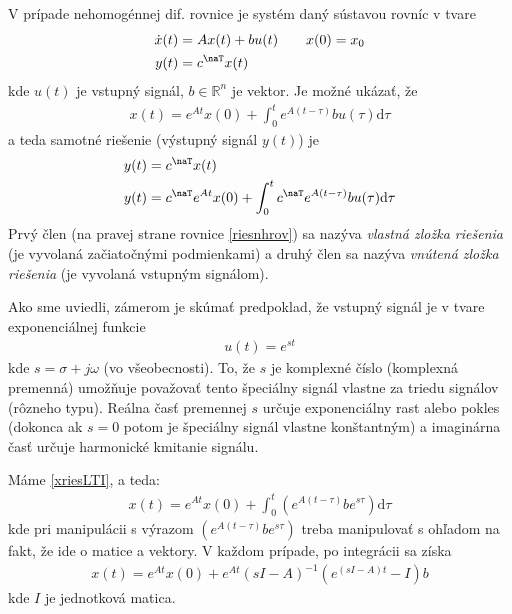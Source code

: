 \documentclass[a4paper, 10pt, ]{article}
\begin{document}
V prípade nehomogénnej dif. rovnice je systém daný sústavou rovníc v tvare
\begin{subequations} \label{sysLTIstavpries}
    \begin{align}
        \dot x(t) &= A x(t) + b u(t) \qquad x(0) = x_0 \\
        y(t) &= c^\naT x(t)
    \end{align}
\end{subequations}
kde $u(t)$ je vstupný signál, $b \in \mathbb{R}^{n}$ je vektor. Je možné ukázať, že
\begin{align} \label{xriesLTI}
	x(t) = e^{At} x(0) + \int_0^t e^{A(t-\tau)} b u(\tau) \text{d}\tau
\end{align}
a teda samotné riešenie (výstupný signál $y(t)$) je
\begin{subequations}
    \begin{align}
        y(t) &= c^\naT x(t) \\
        y(t) &= c^\naT e^{At} x(0) + \int_0^t c^\naT e^{A(t-\tau)} b u(\tau) \text{d}\tau \label{riesnhrov}
    \end{align}
\end{subequations}
Prvý člen (na pravej strane rovnice \eqref{riesnhrov}) sa nazýva \emph{vlastná zložka riešenia} (je vyvolaná začiatočnými podmienkami) a druhý člen sa nazýva  \emph{vnútená zložka riešenia} (je vyvolaná vstupným signálom).

Ako sme uviedli, zámerom je skúmať predpoklad, že vstupný signál je v tvare exponenciálnej funkcie
\begin{align}
	u(t) = e^{st}
\end{align}
kde $s = \sigma + j\omega$ (vo všeobecnosti). To, že $s$ je komplexné číslo (komplexná premenná) umožňuje považovať tento špeciálny signál vlastne za triedu signálov (rôzneho typu). Reálna časť premennej $s$ určuje exponenciálny rast alebo pokles (dokonca ak $s = 0$ potom je špeciálny signál vlastne konštantným) a imaginárna časť určuje harmonické kmitanie signálu.

Máme \eqref{xriesLTI}, a teda:
\begin{align}
	x(t) = e^{At} x(0) + \int_0^t \left( e^{A(t-\tau)} b e^{s\tau} \right) \text{d}\tau
\end{align}
kde pri manipulácii s výrazom $ \left( e^{A(t-\tau)} b e^{s\tau} \right)$ treba manipulovať s ohľadom na fakt, že ide o matice a vektory. V každom prípade, po integrácii sa získa
\begin{align}
	x(t) = e^{At} x(0) + e^{At} \left( sI - A \right)^{-1}  \left( e^{(sI-A)t} - I \right) b
\end{align}
kde $I$ je jednotková matica.
\end{document}
